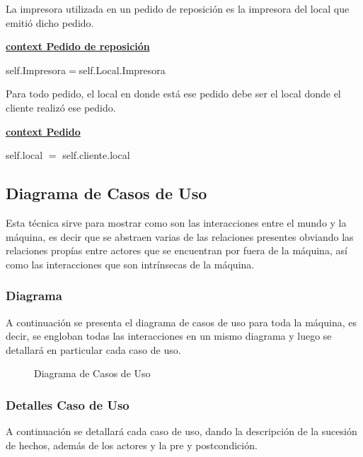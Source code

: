 \documentclass[a4paper,10pt]{article}
\begin{document}
\noindent La impresora utilizada en un pedido de reposición es la impresora del local que emitió dicho pedido.

\medskip

\underline{\textbf{context Pedido de reposición}}

self.Impresora$=$self.Local.Impresora

\bigskip

\noindent Para todo pedido, el local en donde est\'a ese pedido debe ser el local donde el cliente realiz\'o ese pedido.

\medskip

\underline{\textbf{context Pedido}}

self.local $=$ self.cliente.local

\newpage

\subsection*{Diagrama de Casos de Uso}

Esta t\'ecnica sirve para mostrar como son las interacciones entre el mundo y la m\'aquina, es decir que se abstraen varias de las relaciones presentes
obviando las relaciones prop\'ias entre actores que se encuentran por fuera de la m\'aquina, as\'i como las interacciones que son intr\'insecas de la m\'aquina.

\subsubsection*{Diagrama}

A continuaci\'on se presenta el diagrama de casos de uso para toda la m\'aquina, es decir, se engloban todas las interacciones en un mismo diagrama
y luego se detallar\'a en particular cada caso de uso.


\begin{figure}[H]
\centering
{}
\caption{Diagrama de Casos de Uso}
\end{figure}


\subsubsection*{Detalles Caso de Uso}

A continuaci\'on se detallar\'a cada caso de uso, dando la descripci\'on de la sucesi\'on de hechos, adem\'as de los actores y la pre y postcondici\'on.
\end{document}
